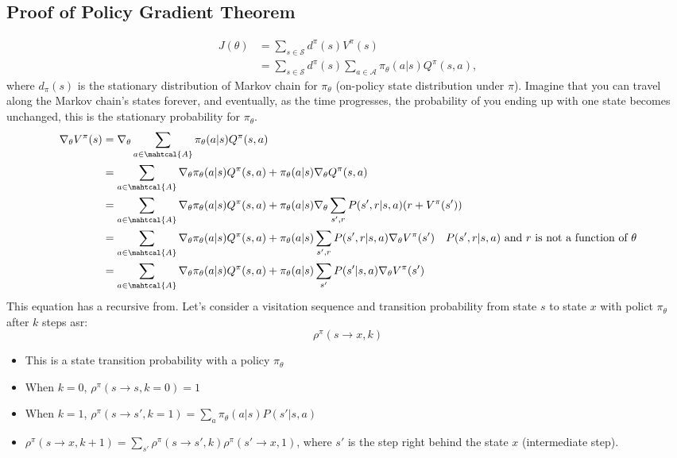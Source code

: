 \subsection{Proof of Policy Gradient Theorem}
\begin{align*}
	J(\theta) &= \sum_{s \in \mathcal{S}} d^\pi(s) V^\pi(s)\\ 
	&= \sum_{s \in \mathcal{S}} d^\pi(s) \sum_{a \in \mathcal{A}} \pi_\theta(a \vert s) Q^\pi(s, a),
\end{align*}
where $d_\pi(s)$ is the stationary distribution of Markov chain for $\pi_\theta$ (on-policy state distribution under $\pi$). Imagine that you can travel along the Markov chain's states forever, and eventually, as the time progresses, the probability of you ending up with one state becomes unchanged, this is the stationary probability for $\pi_\theta$.
\begin{align*}
	\nabla_\theta V^\pi(s) &= \nabla_\theta \sum_{a\in \mahtcal{A}}\pi_\theta(a|s)Q^\pi(s,a)\\
	&= \sum_{a\in \mahtcal{A}}\nabla_\theta \pi_\theta(a|s)Q^\pi(s,a) + \pi_\theta(a|s) \nabla_\theta Q^\pi(s,a)\\
	&= \sum_{a\in \mahtcal{A}}\nabla_\theta \pi_\theta(a|s)Q^\pi(s,a) + \pi_\theta(a|s) \nabla_\theta \sum_{s',r} P(s',r|s,a)(r+V^\pi(s'))\\
	&= \sum_{a\in \mahtcal{A}}\nabla_\theta \pi_\theta(a|s)Q^\pi(s,a) + \pi_\theta(a|s) \sum_{s',r} P(s',r|s,a) \nabla_\theta V^\pi(s') \quad P(s',r|s,a) \textrm{ and } r \textrm{ is not a function of } \theta\\
	&= \sum_{a\in \mahtcal{A}}\nabla_\theta \pi_\theta(a|s)Q^\pi(s,a) + \pi_\theta(a|s) \sum_{s'} P(s'|s,a) \nabla_\theta V^\pi(s') \\
\end{align*}
This equation has a recursive from. Let's consider a visitation sequence and transition probability from state $s$ to state $x$ with polict $\pi_\theta$ after $k$ steps asr: 
$$\rho^\pi(s\to x, k)$$
\begin{itemize}
	\item This is a state transition probability with a policy $\pi_\theta$
	\item When $k=0$, $\rho^\pi(s\to s, k=0) = 1$ 
	\item When $k=1$, $\rho^\pi(s\to s', k=1) = \sum_a \pi_\theta(a|s)P(s'|s,a)$ 
	\item $\rho^\pi(s\to x, k+1)=\sum_{s'}\rho^\pi(s\to s', k)\rho^\pi(s'\to x, 1)$, where $s'$ is the step right behind the state $x$ (intermediate step). 
\end{itemize}


